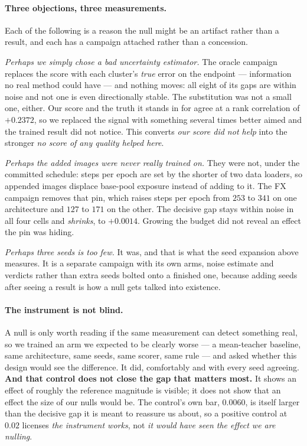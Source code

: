 \documentclass{article}
\begin{document}
\paragraph{Three objections, three measurements.} Each of the following is a reason the null might
be an artifact rather than a result, and each has a campaign attached rather than a concession.

\emph{Perhaps we simply chose a bad uncertainty estimator.} The oracle campaign replaces the score
with each cluster's \emph{true} error on the endpoint --- information no real method could have ---
and nothing moves: all eight of its gaps are within noise and not one is even directionally stable.
The substitution was not a small one, either. Our score and the truth it stands in for agree at a
rank correlation of $+0.2372$, so we replaced the signal with something several times better aimed
and the trained result did not notice. This converts \emph{our score did not help} into the stronger
\emph{no score of any quality helped here}.

\emph{Perhaps the added images were never really trained on.} They were not, under the committed
schedule: steps per epoch are set by the shorter of two data loaders, so appended images displace
base-pool exposure instead of adding to it. The FX campaign removes that pin, which raises steps per
epoch from $253$ to $341$ on one architecture and $127$ to $171$ on the other. The decisive gap
stays within noise in all four cells and \emph{shrinks}, to $+0.0014$. Growing the budget did not
reveal an effect the pin was hiding.

\emph{Perhaps three seeds is too few.} It was, and that is what the seed expansion above measures.
It is a separate campaign with its own arms, noise estimate and verdicts rather than extra seeds
bolted onto a finished one, because adding seeds after seeing a result is how a null gets talked
into existence.

\paragraph{The instrument is not blind.} A null is only worth reading if the same measurement can
detect something real, so we trained an arm we expected to be clearly worse --- a mean-teacher
baseline, same architecture, same seeds, same scorer, same rule --- and asked whether this design
would see the difference. It did, comfortably and with every seed agreeing.
\textbf{And that control does not close the gap that matters most.} It shows an effect of roughly
the reference magnitude is visible; it does not show that an effect the size of our nulls would be.
The control's own bar, $0.0060$, is itself larger than the decisive gap it is meant to reassure us
about, so a positive control at $0.02$ licenses \emph{the instrument works}, not \emph{it would have
seen the effect we are nulling}.
\end{document}
